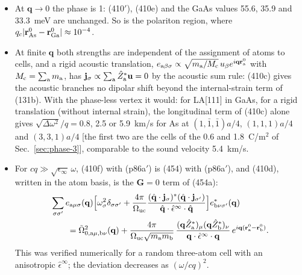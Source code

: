 \documentclass[11pt]{article}
\begin{document}
\begin{itemize}
\item At $\mathbf q\to0$ the phase is 1: (410$'$), (410e) and the GaAs values 55.6, 35.9 and 33.3~meV are
unchanged. So is the polariton region, where $q_c|\mathbf r^0_{\rm As}-\mathbf r^0_{\rm Ga}|\approx10^{-4}$.
\item At finite $\mathbf q$ both strengths are independent of the assignment of atoms to cells, and a rigid
acoustic translation, $e_{{\rm a}\beta\sigma}\propto\sqrt{m_{\rm a}/M_{\rm c}}\,u_\beta
e^{i\mathbf q\mathbf r^0_{\rm a}}$ with $M_{\rm c}=\sum_{\rm a}m_{\rm a}$, has
$\mathbf j_\sigma\propto\sum_{\rm a}\hat Z^*_{\rm a}\mathbf u=0$ by the acoustic sum rule: (410c) gives the
acoustic branches no dipolar shift beyond the internal-strain term of (131b). With the phase-less vertex
it would: for LA[111] in GaAs, for a rigid translation (without internal strain), the longitudinal term
of (410c) alone gives $\sqrt{\Delta\omega^2}/q=0.8$, 2.5 or 5.9~km/s for As at $(1,\bar1,\bar1)a/4$,
$(1,1,1)a/4$ and $(3,3,1)a/4$ [the first two are the cells of the 0.6 and 1.8~C/m$^2$ of
Sec.~\ref{sec:phase-3}], comparable to the sound velocity 5.4~km/s.
\item For $cq\gg\sqrt{\epsilon_\infty}\,\omega$, (410f) with (p86a$'$) is (454) with (p86a$'$), and (410d),
written in the atom basis, is the $\mathbf G=0$ term of (454a):
\begin{equation*}
\begin{split}
&\sum_{\sigma\sigma'}e_{{\rm a}\mu\sigma}(\mathbf q)\Big[\omega^2_\sigma\delta_{\sigma\sigma'}
+\frac{4\pi}{\Omega_{\rm uc}}\frac{(\hat{\mathbf q}\cdot\mathbf j_\sigma)^*(\hat{\mathbf q}\cdot\mathbf j_{\sigma'})}
{\hat{\mathbf q}\cdot\hat\epsilon^\infty\cdot\hat{\mathbf q}}\Big]e^*_{{\rm b}\nu\sigma'}(\mathbf q)\\
&\qquad=\tilde\Omega^2_{0,{\rm a}\mu,{\rm b}\nu}(\mathbf q)
+\frac{4\pi}{\Omega_{\rm uc}\sqrt{m_{\rm a}m_{\rm b}}}\,
\frac{(\mathbf q\hat Z^*_{\rm a})_\mu(\mathbf q\hat Z^*_{\rm b})_\nu}{\mathbf q\cdot\hat\epsilon^\infty\cdot\mathbf q}\,
e^{i\mathbf q(\mathbf r^0_{\rm a}-\mathbf r^0_{\rm b})}.
\end{split}
\end{equation*}
This was verified numerically for a random three-atom cell with an anisotropic $\hat\epsilon^\infty$; the
deviation decreases as $(\omega/cq)^2$.
\end{itemize}
\end{document}
